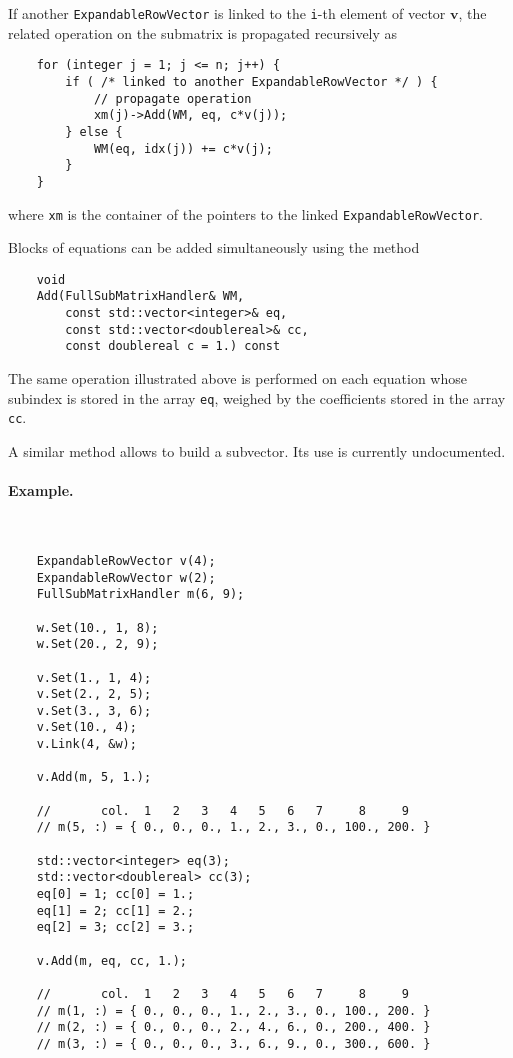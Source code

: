 \documentclass[10pt,fleqn,subeqn]{report}
\newcommand{\T}[1]{\bm{#1}}
\begin{document}
If another \texttt{ExpandableRowVector} is linked
to the \texttt{i}-th element of vector $\T{v}$,
the related operation on the submatrix is propagated recursively as
\begin{verbatim}
    for (integer j = 1; j <= n; j++) {
        if ( /* linked to another ExpandableRowVector */ ) {
            // propagate operation
            xm(j)->Add(WM, eq, c*v(j));
        } else {
            WM(eq, idx(j)) += c*v(j);
        }
    }
\end{verbatim}
where \texttt{xm} is the container of the pointers to the linked
\texttt{ExpandableRowVector}.

Blocks of equations can be added simultaneously using the method
\begin{verbatim}
    void
    Add(FullSubMatrixHandler& WM,
        const std::vector<integer>& eq,
        const std::vector<doublereal>& cc,
        const doublereal c = 1.) const
\end{verbatim}
The same operation illustrated above is performed on each equation
whose subindex is stored in the array \texttt{eq}, weighed by the
coefficients stored in the array \texttt{cc}.

A similar method allows to build a subvector.
Its use is currently undocumented.

\paragraph{Example.} \
\begin{verbatim}
    ExpandableRowVector v(4);
    ExpandableRowVector w(2);
    FullSubMatrixHandler m(6, 9);

    w.Set(10., 1, 8);
    w.Set(20., 2, 9);

    v.Set(1., 1, 4);
    v.Set(2., 2, 5);
    v.Set(3., 3, 6);
    v.Set(10., 4);
    v.Link(4, &w);

    v.Add(m, 5, 1.);

    //       col.  1   2   3   4   5   6   7     8     9
    // m(5, :) = { 0., 0., 0., 1., 2., 3., 0., 100., 200. }

    std::vector<integer> eq(3);
    std::vector<doublereal> cc(3);
    eq[0] = 1; cc[0] = 1.;
    eq[1] = 2; cc[1] = 2.;
    eq[2] = 3; cc[2] = 3.;

    v.Add(m, eq, cc, 1.);

    //       col.  1   2   3   4   5   6   7     8     9
    // m(1, :) = { 0., 0., 0., 1., 2., 3., 0., 100., 200. }
    // m(2, :) = { 0., 0., 0., 2., 4., 6., 0., 200., 400. }
    // m(3, :) = { 0., 0., 0., 3., 6., 9., 0., 300., 600. }
\end{verbatim}
\end{document}
